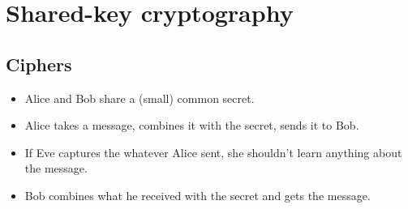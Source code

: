 \mode*




\section{Shared-key cryptography}

\subsection{Ciphers}

\begin{frame}
  \begin{idea}
    \begin{itemize}
      \item Alice and Bob share a (small) common secret.

        \pause{}

      \item Alice takes a message, combines it with the secret, sends it to 
        Bob.

        \pause{}

      \item If Eve captures the whatever Alice sent, she shouldn't learn 
        anything about the message.

        \pause{}

      \item Bob combines what he received with the secret and gets the message.
    \end{itemize}
  \end{idea}
\end{frame}

